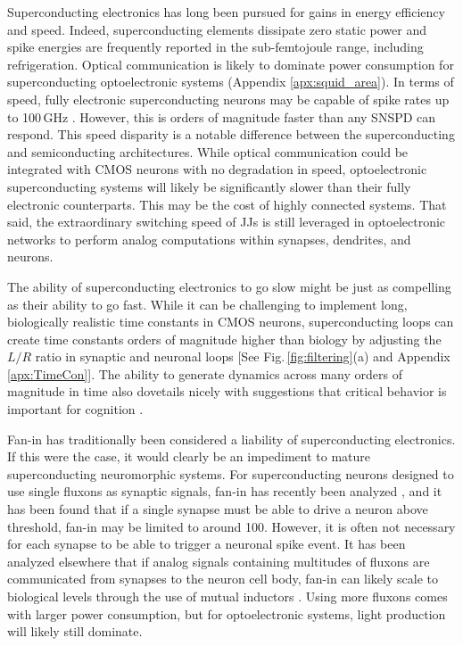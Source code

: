 \documentclass[twocolumn]{article}
\begin{document}
Superconducting electronics has long been pursued for gains in energy efficiency and speed. Indeed, superconducting elements dissipate zero static power and spike energies are frequently reported in the sub-femtojoule range, including refrigeration. Optical communication is likely to dominate power consumption for superconducting optoelectronic systems (Appendix \ref{apx:squid_area}). In terms of speed, fully electronic superconducting neurons may be capable of spike rates up to 100\,GHz \cite{schneider2018tutorial, schneider2017energy}. However, this is orders of magnitude faster than any SNSPD can respond. This speed disparity is a notable difference between the superconducting and semiconducting architectures. While optical communication could be integrated with CMOS neurons with no degradation in speed, optoelectronic superconducting systems will likely be significantly slower than their fully electronic counterparts. This may be the cost of highly connected systems. That said, the extraordinary switching speed of JJs is still leveraged in optoelectronic networks to perform analog computations within synapses, dendrites, and neurons.

The ability of superconducting electronics to go slow might be just as compelling as their ability to go fast. While it can be challenging to implement long, biologically realistic time constants in CMOS neurons, superconducting loops can create time constants orders of magnitude higher than biology by adjusting the $L/R$ ratio in synaptic and neuronal loops [See Fig.\,\ref{fig:filtering}(a) and Appendix \ref{apx:TimeCon}]. The ability to generate dynamics across many orders of magnitude in time also dovetails nicely with suggestions that critical behavior is important for cognition \cite{cocchi2017criticality}. 

Fan-in has traditionally been considered a liability of superconducting electronics. If this were the case, it would clearly be an impediment to mature superconducting neuromorphic systems. For superconducting neurons designed to use single fluxons as synaptic signals, fan-in has recently been analyzed \cite{schneider2020fan}, and it has been found that if a single synapse must be able to drive a neuron above threshold, fan-in may be limited to around 100. However, it is often not necessary for each synapse to be able to trigger a neuronal spike event. It has been analyzed elsewhere that if analog signals containing multitudes of fluxons are communicated from synapses to the neuron cell body, fan-in can likely scale to biological levels through the use of mutual inductors \cite{shainline2019superconducting}. Using more fluxons comes with larger power consumption, but for optoelectronic systems, light production will likely still dominate.
\end{document}
